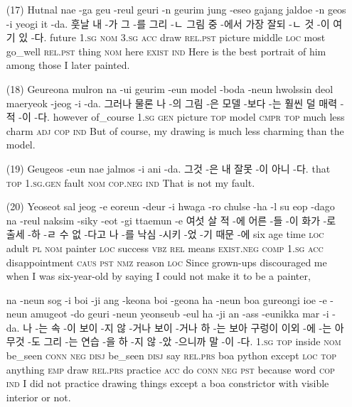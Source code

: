 \begin{itemize}
\item [(17)]
\tgl
		{Hutnal nae -ga geu -reul geuri -n geurim jung -eseo gajang jaldoe -n geos -i yeogi it -da.}
		{훗날 내 -가 그 -를 그리 -ㄴ 그림 중 -에서 가장 잘되 -ㄴ 것 -이 여기 있 -다.}
		{future	\textsc{1.sg}	\textsc{nom}	\textsc{3.sg}	\textsc{acc}	draw	\textsc{rel.pst}	picture	middle	\textsc{loc}	most	go\_well	\textsc{rel.pst}	thing	\textsc{nom}	here	\textsc{exist}	\textsc{ind}}
		{Here is the best portrait of him among those I later painted.}
		
\item [(18)]
\tgl
		{Geureona mulron na -ui geurim -eun model -boda -neun hwolssin deol maeryeok -jeog -i -da.}
		{그러나 물론 나 -의 그림 -은 모델 -보다 -는 훨씬 덜 매력 -적 -이 -다.}
		{however	of\_course	\textsc{1.sg}	\textsc{gen}	picture	\textsc{top}	model	\textsc{cmpr}	\textsc{top}	much	less	charm	\textsc{adj}	\textsc{cop}	\textsc{ind}}
		{But of course, my drawing is much less charming than the model.}
		
\item [(19)]
\tgl
		{Geugeos -eun nae jalmos -i ani -da.}
		{그것 -은 내 잘못 -이 아니 -다.}
		{that	\textsc{top}	\textsc{1.sg.gen}	fault	\textsc{nom}	\textsc{cop.neg}	\textsc{ind}}
		{That is not my fault.}
		
\item [(20)]
\tgl
		{Yeoseot sal jeog -e eoreun -deur -i hwaga -ro chulse -ha -l su eop -dago na -reul naksim -siky -eot -gi ttaemun -e}
		{여섯 살 적 -에 어른 -들 -이 화가 -로 출세 -하 -ㄹ 수 없 -다고 나 -를 낙심 -시키 -었 -기 때문 -에}
		{six	age	time	\textsc{loc}	adult	\textsc{pl}	\textsc{nom}	painter	\textsc{loc}	success	\textsc{vbz}	\textsc{rel}	means	\textsc{exist.neg}	\textsc{comp}	\textsc{1.sg}	\textsc{acc}	disappointment	\textsc{caus}	\textsc{pst}	\textsc{nmz}	reason	\textsc{loc}}
		{Since grown-ups discouraged me when I was six-year-old by saying I could not make it to be a painter,}
		
\tgl
		{na -neun sog -i boi -ji ang -keona boi -geona ha -neun boa gureongi ioe -e -neun amugeot -do geuri -neun yeonseub -eul ha -ji an -ass -eunikka mar -i -da.}
		{나 -는 속 -이 보이 -지 않 -거나 보이 -거나 하 -는 보아 구렁이 이외 -에 -는 아무것 -도 그리 -는 연습 -을 하 -지 않 -았 -으니까 말 -이 -다.}
		{\textsc{1.sg}	\textsc{top}	inside	\textsc{nom}	be\_seen	\textsc{conn}	\textsc{neg}	\textsc{disj}	be\_seen	\textsc{disj}	say	\textsc{rel.prs}	boa	python	except	\textsc{loc}	\textsc{top}	anything	\textsc{emp}	draw	\textsc{rel.prs}	practice	\textsc{acc}	do	\textsc{conn}	\textsc{neg}	\textsc{pst}	because	word	\textsc{cop}	\textsc{ind}}
		{I did not practice drawing things except a boa constrictor with visible interior or not.}


\end{itemize}
